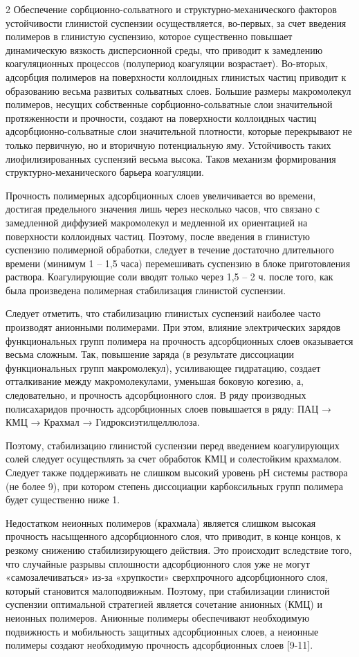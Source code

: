 \begin{multicols}{2}
Обеспечение сорбционно-сольватного и структурно-механического факторов
устойчивости глинистой суспензии осуществляется, во-первых, за счет
введения полимеров в глинистую суспензию, которое существенно повышает
динамическую вязкость дисперсионной среды, что приводит к замедлению
коагуляционных процессов (полупериод коагуляции возрастает). Во-вторых,
адсорбция полимеров на поверхности коллоидных глинистых частиц приводит
к образованию весьма развитых сольватных слоев. Большие размеры
макромолекул полимеров, несущих собственные сорбционно-сольватные слои
значительной протяженности и прочности, создают на поверхности
коллоидных частиц адсорбционно-сольватные слои значительной плотности,
которые перекрывают не только первичную, но и вторичную потенциальную
яму. Устойчивость таких лиофилизированных суспензий весьма высока. Таков
механизм формирования структурно-механического барьера коагуляции.

Прочность полимерных адсорбционных слоев увеличивается во времени,
достигая предельного значения лишь через несколько часов, что связано с
замедленной диффузией макромолекул и медленной их ориентацией на
поверхности коллоидных частиц. Поэтому, после введения в глинистую
суспензию полимерной обработки, следует в течение достаточно длительного
времени (минимум 1 -- 1,5 часа) перемешивать суспензию в блоке
приготовления раствора. Коагулирующие соли вводят только через 1,5 -- 2
ч. после того, как была произведена полимерная стабилизация глинистой
суспензии.

Следует отметить, что стабилизацию глинистых суспензий наиболее часто
производят анионными полимерами. При этом, влияние электрических зарядов
функциональных групп полимера на прочность адсорбционных слоев
оказывается весьма сложным. Так, повышение заряда (в результате
диссоциации функциональных групп макромолекул), усиливающее гидратацию,
создает отталкивание между макромолекулами, уменьшая боковую когезию, а,
следовательно, и прочность адсорбционного слоя. В ряду производных
полисахаридов прочность адсорбционных слоев повышается в ряду: ПАЦ → КМЦ
→ Крахмал → Гидроксиэтилцеллюлоза.

Поэтому, стабилизацию глинистой суспензии перед введением коагулирующих
солей следует осуществлять за счет обработок КМЦ и солестойким
крахмалом. Следует также поддерживать не слишком высокий уровень рН
системы раствора (не более 9), при котором степень диссоциации
карбоксильных групп полимера будет существенно ниже 1.

Недостатком неионных полимеров (крахмала) является слишком высокая
прочность насыщенного адсорбционного слоя, что приводит, в конце концов,
к резкому снижению стабилизирующего действия. Это происходит вследствие
того, что случайные разрывы сплошности адсорбционного слоя уже не могут
«самозалечиваться» из-за «хрупкости» сверхпрочного адсорбционного слоя,
который становится малоподвижным. Поэтому, при стабилизации глинистой
суспензии оптимальной стратегией является сочетание анионных (КМЦ) и
неионных полимеров. Анионные полимеры обеспечивают необходимую
подвижность и мобильность защитных адсорбционных слоев, а неионные
полимеры создают необходимую прочность адсорбционных слоев {[}9-11{]}.


\end{multicols}
